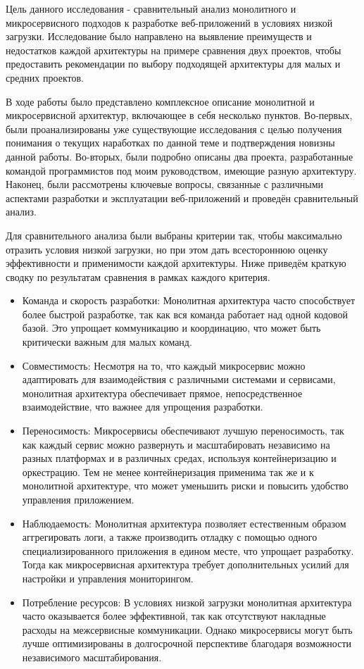 
    Цель данного исследования - сравнительный анализ монолитного и микросервисного подходов к разработке веб-приложений в условиях низкой загрузки. Исследование было направлено на выявление преимуществ и недостатков каждой архитектуры на примере сравнения двух проектов, чтобы предоставить рекомендации по выбору подходящей архитектуры для малых и средних проектов.

    В ходе работы было представлено комплексное описание монолитной и микросервисной архитектур, включающее в себя несколько пунктов. Во-первых, были проанализированы уже существующие исследования с целью получения понимания о текущих наработках по данной теме и подтверждения новизны данной работы. Во-вторых, были подробно описаны два проекта, разработанные командой программистов под моим руководством, имеющие разную архитектуру. Наконец, были рассмотрены ключевые вопросы, связанные с различными аспектами разработки и эксплуатации веб-приложений и проведён сравнительный анализ.

    Для сравнительного анализа были выбраны критерии так, чтобы максимально отразить условия низкой загрузки, но при этом дать всестороннюю оценку эффективности и применимости каждой архитектуры. Ниже приведём краткую сводку по результатам сравнения в рамках каждого критерия.

    \begin{itemize}
        \item Команда и скорость разработки: Монолитная архитектура часто способствует более быстрой разработке, так как вся команда работает над одной кодовой базой. Это упрощает коммуникацию и координацию, что может быть критически важным для малых команд.
        \item Совместимость: Несмотря на то, что каждый микросервис можно адаптировать для взаимодействия с различными системами и сервисами, монолитная архитектура обеспечивает прямое, непосредственное взаимодействие, что важнее для упрощения разработки.
        \item Переносимость: Микросервисы обеспечивают лучшую переносимость, так как каждый сервис можно развернуть и масштабировать независимо на разных платформах и в различных средах, используя контейнеризацию и оркестрацию. Тем не менее контейнеризация применима так же и к монолитной архитектуре, что может уменьшить риски и повысить удобство управления приложением.
        \item Наблюдаемость: Монолитная архитектура позволяет естественным образом аггрегировать логи, а также производить отладку с помощью одного специализированного приложения в едином месте, что упрощает разработку. Тогда как микросервисная архитектура требует дополнительных усилий для настройки и управления мониторингом.
        \item Потребление ресурсов: В условиях низкой загрузки монолитная архитектура часто оказывается более эффективной, так как отсутствуют накладные расходы на межсервисные коммуникации. Однако микросервисы могут быть лучше оптимизированы в долгосрочной перспективе благодаря возможности независимого масштабирования.
    \end{itemize}

